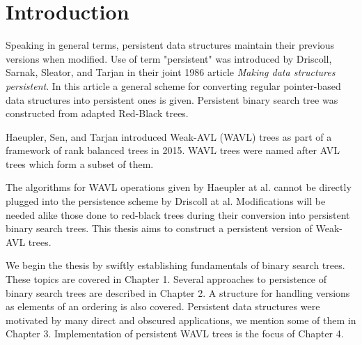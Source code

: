 \chapter*{Introduction}

Speaking in general terms, persistent data structures maintain their previous versions when modified. Use of term "persistent" was introduced by Driscoll, Sarnak, Sleator, and Tarjan in their joint 1986 article \emph{Making data structures persistent}\cite{persistence-DSST}. In this article a general scheme for converting regular pointer-based data structures into persistent ones is given. Persistent binary search tree was constructed from adapted Red-Black trees.

Haeupler, Sen, and Tarjan \cite{weight-balanced} introduced Weak-AVL (WAVL) trees as part of a framework of rank balanced trees in 2015. WAVL trees were named after AVL trees which form a subset of them.

The algorithms for WAVL operations given by Haeupler at al. cannot be directly plugged into the persistence scheme by Driscoll at al. Modifications will be needed alike those done to red-black trees during their conversion into persistent binary search trees. This thesis aims to construct a persistent version of Weak-AVL trees.

We begin the thesis by swiftly establishing fundamentals of binary search trees.  These topics are covered in Chapter 1. Several approaches to persistence of binary search trees are described in Chapter 2. A structure for handling versions as elements of an ordering is also covered. Persistent data structures were motivated by many direct and obscured applications, we mention some of them in Chapter 3. Implementation of persistent WAVL trees is the focus of Chapter 4.

